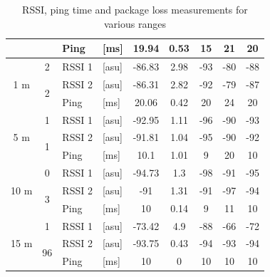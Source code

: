 \begin{table}[H]
\begin{tabular}{|c|c|l|l|c|c|c|c|c|}
        && Ping & [ms] & 19.94 & 0.53 & 15 & 21 & 20 \\\hline\hline
        \multirow{3}{*}{1 m} & \multirow{1}{*}{2} & RSSI 1 & [asu] & -86.83 & 2.98 & -93 & -80 & -88 \\\cline{2-9}\cline{2-9}
        & \multirow{2}{*}{2} & RSSI 2 & [asu] & -86.31 & 2.82 & -92 & -79 & -87 \\\cline{3-9}
        && Ping & [ms] & 20.06 & 0.42 & 20 & 24 & 20 \\\hline\hline
        \multirow{3}{*}{5 m} & \multirow{1}{*}{1} & RSSI 1 & [asu] & -92.95 & 1.11 & -96 & -90 & -93 \\\cline{2-9}\cline{2-9}
        & \multirow{2}{*}{1} & RSSI 2 & [asu] & -91.81 & 1.04 & -95 & -90 & -92 \\\cline{3-9}
        && Ping & [ms] & 10.1 & 1.01 & 9 & 20 & 10 \\\hline\hline
        \multirow{3}{*}{10 m} & \multirow{1}{*}{0} & RSSI 1 & [asu] & -94.73 & 1.3 & -98 & -91 & -95 \\\cline{2-9}\cline{2-9}
        & \multirow{2}{*}{3} & RSSI 2 & [asu] & -91 & 1.31 & -91 & -97 & -94 \\\cline{3-9}
        && Ping & [ms] & 10 & 0.14 & 9 & 11 & 10 \\\hline\hline
        \multirow{3}{*}{15 m} & \multirow{1}{*}{1} & RSSI 1 & [asu] & -73.42 & 4.9 & -88 & -66 & -72 \\\cline{2-9}\cline{2-9}
        & \multirow{2}{*}{96} & RSSI 2 & [asu] & -93.75 & 0.43 & -94 & -93 & -94 \\\cline{3-9}
        && Ping & [ms] & 10 & 0 & 10 & 10 & 10 \\\hline
    \end{tabular}
    \vspace{\ftspace}
    \caption{RSSI, ping time and package loss measurements for various ranges}
    \label{tab:rssipingrange_esp32c6}
\end{table}

